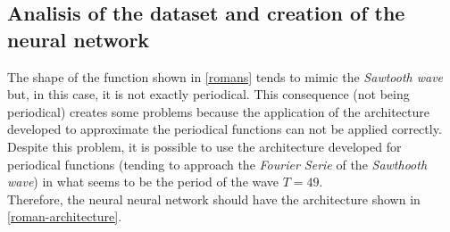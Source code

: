 \documentclass[a4paper, 11pt]{article}
\begin{document}
\subsection{Analisis of the dataset and creation of the neural network} 
The shape of the function shown in \ref{romans} tends to mimic the \textit{Sawtooth wave} but, in this case, it is not exactly periodical. This consequence (not being periodical) creates some problems because the application of the architecture developed to approximate the periodical functions can not be applied correctly.\\
Despite this problem, it is possible to use the architecture developed for periodical functions (tending to approach the \textit{Fourier Serie} of the \textit{Sawthooth wave}) in what seems to be the period of the wave $T=49$. \\
Therefore, the neural neural network should have the architecture shown in \ref{roman-architecture}.
\end{document}
